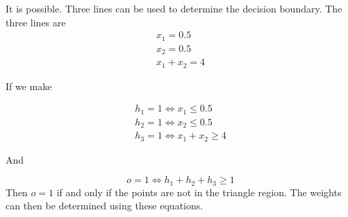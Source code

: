 \begin{answer}
    It is possible. Three lines can be used to determine the decision boundary. The three lines are
    $$
    \begin{aligned}
        x_1 = 0.5\\
        x_2 = 0.5\\
        x_1 + x_2 = 4
    \end{aligned}
    $$

    If we make 

    $$
    \begin{aligned}
        h_1 = 1 \Leftrightarrow x_1 \le 0.5\\
        h_2 = 1 \Leftrightarrow x_2 \le 0.5\\
        h_3 = 1 \Leftrightarrow x_1 + x_2 \ge 4
    \end{aligned}
    $$

    And 

    $$
        o = 1 \Leftrightarrow h_1 + h_2 + h_3 \ge 1
        $$
    Then $o = 1$ if and only if the points are not in the triangle region. The weights can then be determined using these equations.


 \end{answer}
